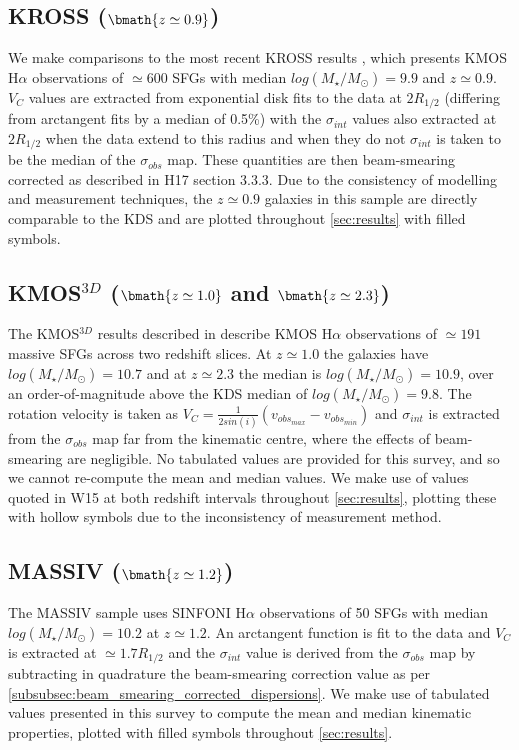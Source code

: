 \documentclass[fleqn,usenatbib]{mnras}
\begin{document}
\subsection{KROSS ($\bmath{z\simeq0.9}$)}\label{subsec:KROSS}
We make comparisons to the most recent KROSS results \citep[H17]{Harrison2017}, which presents KMOS H$\alpha$ observations of $\simeq600$ SFGs with median $log(M_{\star}/M_{\odot})=9.9$ and $z\simeq0.9$.
$V_{C}$ values are extracted from exponential disk fits to the data at $2R_{1/2}$ (differing from arctangent fits by a median of 0.5\%) with the $\sigma_{int}$ values also extracted at $2R_{1/2}$ when the data extend to this radius and when they do not $\sigma_{int}$ is taken to be the median of the $\sigma_{obs}$ map.
These quantities are then beam-smearing corrected as described in H17 section 3.3.3. 
Due to the consistency of modelling and measurement techniques, the $z\simeq0.9$ galaxies in this sample are directly comparable to the KDS and are plotted throughout \cref{sec:results} with filled symbols.

\subsection{KMOS$^{3D}$ ($\bmath{z\simeq1.0}$ and $\bmath{z\simeq2.3}$)}\label{subsec:kmos_3d}
The KMOS$^{3D}$ results described in \cite[W15]{Wisnioski2015} describe KMOS H$\alpha$ observations of $\simeq191$ massive SFGs across two redshift slices. 
At $z\simeq1.0$ the galaxies have $log(M_{\star}/M_{\odot})=10.7$ and at $z\simeq2.3$ the median is $log(M_{\star}/M_{\odot})=10.9$, over an order-of-magnitude above the KDS median of $log(M_{\star}/M_{\odot})=9.8$. The rotation velocity is taken as $V_{C} = \frac{1}{2sin(i)}(v_{obs_{max}} - v_{obs_{min}})$ and $\sigma_{int}$ is extracted from the $\sigma_{obs}$ map far from the kinematic centre, where the effects of beam-smearing are negligible.
No tabulated values are provided for this survey, and so we cannot re-compute the mean and median values.
We make use of values quoted in W15 at both redshift intervals throughout \cref{sec:results}, plotting these with hollow symbols due to the inconsistency of measurement method.

\subsection{MASSIV ($\bmath{z\simeq1.2}$)}\label{subsec:MASSIV}
The MASSIV sample \citep[E12]{Epinat2012} uses SINFONI H$\alpha$ observations of 50 SFGs with median $log(M_{\star}/M_{\odot})=10.2$ at $z\simeq1.2$.
An arctangent function is fit to the data and $V_{C}$ is extracted at $\simeq1.7R_{1/2}$ and the $\sigma_{int}$ value is derived from the $\sigma_{obs}$ map by subtracting in quadrature the beam-smearing correction value as per \cref{subsubsec:beam_smearing_corrected_dispersions}.
We make use of tabulated values presented in this survey to compute the mean and median kinematic properties, plotted with filled symbols throughout \cref{sec:results}.
\end{document}
